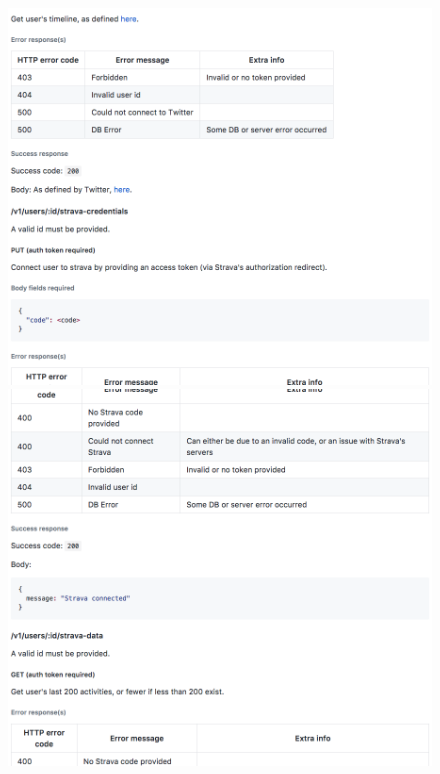 \documentclass[11pt,openright,a4paper]{report}
\begin{document}
\begin{appendices}
\begin{figure}[ht]
  \centering
  \includegraphics[width=.9\textwidth]{i/apidocs13.png}
  \includegraphics[width=.9\textwidth]{i/apidocs14.png}
\end{figure}


\end{appendices}
\end{document}
